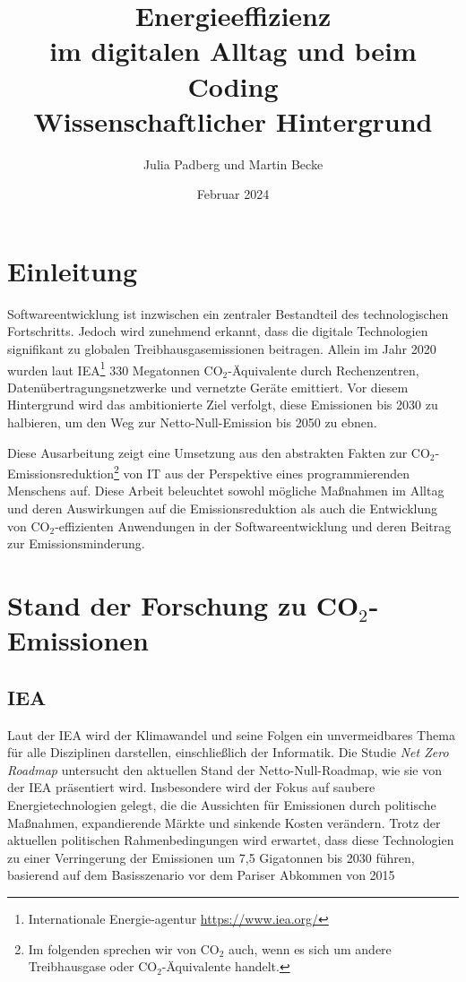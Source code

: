 \documentclass{article}
\title{Energieeffizienz\\im digitalen Alltag und beim Coding\\[2mm]Wissenschaftlicher Hintergrund}
\author{Julia Padberg und Martin Becke}
\date{Februar 2024}
\begin{document}
\maketitle
\tableofcontents

\section{Einleitung}
Softwareentwicklung ist inzwischen ein zentraler Bestandteil des technologischen Fortschritts. Jedoch wird zunehmend erkannt, dass die digitale Technologien signifikant zu globalen Treibhausgasemissionen beitragen. Allein im Jahr 2020  wurden laut IEA\footnote{%
	               Internationale Energie-agentur \href{https://www.iea.org/}{https://www.iea.org/}} 
330 Megatonnen CO$_2$-Äquivalente\cite{iea_digitalisation_tracking} durch Rechenzentren, Datenübertragungsnetzwerke und vernetzte Geräte emittiert. Vor diesem Hintergrund wird das ambitionierte Ziel verfolgt, diese Emissionen bis 2030 zu halbieren, um den Weg zur Netto-Null-Emission bis 2050 zu ebnen.

Diese Ausarbeitung zeigt eine Umsetzung aus den abstrakten Fakten zur CO$_2$-Emissionsreduktion\footnote{%
          Im folgenden sprechen wir von CO$_2$ auch, wenn es sich um andere Treibhausgase 
					oder  CO$_2$-Äquivalente handelt.}
von IT aus der Perspektive eines programmierenden Menschens auf. 
Diese Arbeit beleuchtet sowohl mögliche Maßnahmen im Alltag  und deren Auswirkungen auf die Emissionsreduktion als auch die Entwicklung von CO$_2$-effizienten Anwendungen in der Softwareentwicklung und deren Beitrag zur Emissionsminderung.

\section{Stand der Forschung zu CO$_2$-Emissionen}
 \subsection*{IEA}
  Laut der IEA wird der Klimawandel und seine Folgen ein unvermeidbares Thema für alle Disziplinen darstellen, einschließlich der Informatik. Die Studie \textit{Net Zero Roadmap} \cite{iea_net_zero2023} untersucht den aktuellen Stand der Netto-Null-Roadmap, wie sie von der IEA präsentiert wird. Insbesondere wird der Fokus auf saubere Energietechnologien gelegt, die die Aussichten für Emissionen durch politische Maßnahmen, expandierende Märkte und sinkende Kosten verändern. Trotz der aktuellen politischen Rahmenbedingungen wird erwartet, dass diese Technologien zu einer Verringerung der Emissionen um 7,5 Gigatonnen bis 2030 führen, basierend auf dem Basisszenario vor dem Pariser Abkommen von 2015
	
\end{document}
